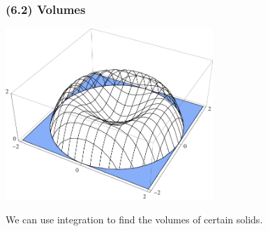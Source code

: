 \begin{frame}
\frametitle{(6.2)  Volumes}
\begin{center}
\includegraphics[height=6.5cm]{volumes/pictures/06-03-setup3d.pdf} %

We can use integration to find the volumes of certain solids.%
\end{center}
\end{frame}

